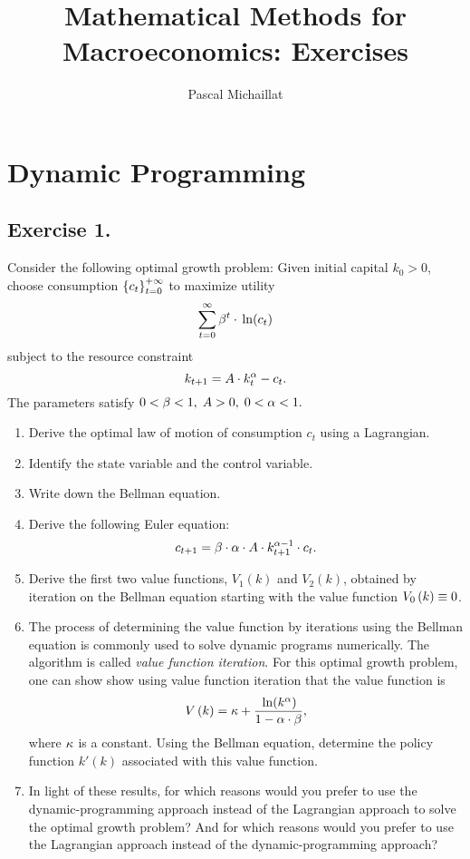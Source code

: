 \documentclass[letterpaper,12pt,leqno]{article}
\begin{document}
\title{Mathematical Methods for Macroeconomics: Exercises}
\author{Pascal Michaillat}
\date{}

\begin{titlepage}
\maketitle
\end{titlepage}

\section*{Dynamic Programming}

\subsection*{Exercise 1.}

Consider the following optimal growth problem: Given initial capital $k_{0}>0$, choose consumption $\left\lbrace c_{t} \right\rbrace _{t =0}^{+\infty}$ to maximize utility
\begin{equation*}
\sum_{t=0}^{\infty}\b ^{t}\cdot \ln{c_{t}}
\end{equation*}
subject to the resource constraint
\begin{equation*}
k_{t+1}=A\cdot k_{t}^{\alpha}-c_{t}.
\end{equation*}
The parameters satisfy $0<\beta<1,\;A>0,\;0<\alpha <1.$

\begin{enumerate}
\item Derive the optimal law of motion of consumption $c_{t}$ using a Lagrangian.
\item Identify the state variable and the control variable. 
\item Write down the Bellman equation.
\item Derive the following Euler equation: 
\begin{equation*}
c_{t+1}=\beta\cdot  \alpha\cdot  A\cdot k_{t+1}^{\alpha -1}\cdot c_{t}.
\end{equation*}

\item Derive the first two value functions, $V_{1}(k)$ and  $V_{2}(k)$, obtained by iteration on the Bellman equation starting with the value function $V_{0}\left( k \right) \equiv 0$. 
\item The process of determining the value function by iterations using the Bellman equation is commonly used to solve dynamic programs numerically. The algorithm is called \textit{value function iteration}. For this optimal growth problem, one can show show using value function iteration that the value function is
\[V\bp{k} =\kappa +\frac{\ln{k^{\a}}}{1-\a\cdot \b},\]
where $\kappa$ is a constant. Using the Bellman equation, determine the policy function $k'(k)$ associated with this value function.
\item In light of these results, for which reasons would you prefer to use the dynamic-programming approach instead of the Lagrangian approach to solve the optimal growth problem? And for which reasons would you prefer to use the Lagrangian approach instead of the dynamic-programming approach?
\end{enumerate}
\end{document}
